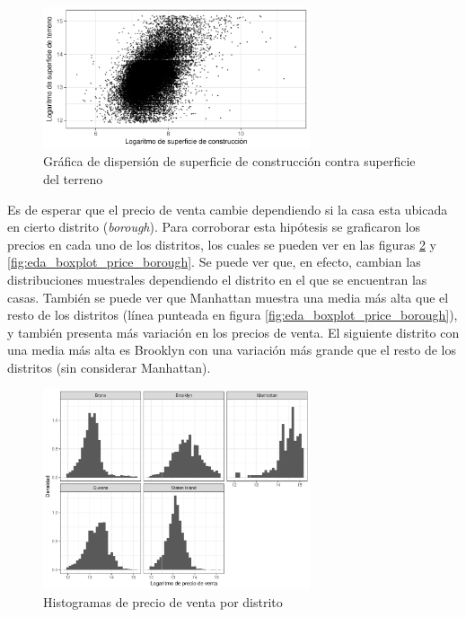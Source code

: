 \begin{figure}[H]
    \centering
    \includegraphics[width=0.7\textwidth]{images/eda_dispersion_superficie_total_vs_superficie.pdf}
    \caption{Gráfica de dispersión de superficie de construcción contra superficie del terreno}
    \label{fig:eda_dispersion_superficie_total_vs_superficie}
\end{figure}


Es de esperar que el precio de venta cambie dependiendo si la casa esta ubicada en cierto distrito (\textit{borough}). Para corroborar esta hipótesis se graficaron los precios en cada uno de los distritos, los cuales se pueden ver en las figuras \ref{fig:eda_histogram_price_borough} y \ref{fig:eda_boxplot_price_borough}. Se puede ver que, en efecto, cambian las distribuciones muestrales dependiendo el distrito en el que se encuentran las casas. También se puede ver que Manhattan muestra una media más alta que el resto de los distritos (línea punteada en figura \ref{fig:eda_boxplot_price_borough}), y también presenta más variación en los precios de venta. El siguiente distrito con una media más alta es Brooklyn con una variación más grande que el resto de los distritos (sin considerar Manhattan). 

\begin{figure}[H]
    \centering
    \includegraphics[width=0.7\textwidth]{images/eda_histogram_price_borough.pdf}
    \caption{Histogramas de precio de venta por distrito}
    \label{fig:eda_histogram_price_borough}
\end{figure}


